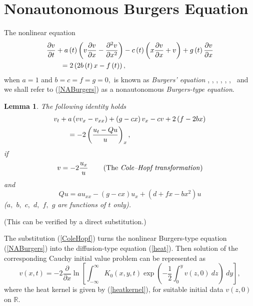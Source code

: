 \documentclass[12pt,reqno]{amsart}
\theoremstyle{plain}
\newtheorem{lemma}{Lemma}
\numberwithin{equation}{section}
\begin{document}
\section{Nonautonomous Burgers Equation}

The nonlinear equation\begin{align}
& \frac{\partial v}{\partial t}+a\left( t\right) \left( v\frac{\partial v}{\partial x}-\frac{\partial ^{2}v}{\partial x^{2}}\right) -c\left( t\right)
\left( x\frac{\partial v}{\partial x}+v\right) +g\left( t\right) \frac{\partial v}{\partial x}  \label{NABurgers} \\
& \qquad =2\left( 2b\left( t\right) x-f\left( t\right) \right) ,  \notag
\end{align}when $a=1$ and $b=c=f=g=0,$ is known as \textit{Burgers' equation} \cite{Bateman15}, \cite{Burgers48}, \cite{Cole50}, \cite{Hopf50}, \cite{Kadom:Karp71}, \cite{Sach87}, \cite{Whitham}\textit{\ }and we shall refer
to (\ref{NABurgers}) as a nonautonomous \textit{Burgers-type equation}.

\begin{lemma}
The following identity holds\begin{align}
& v_{t}+a\left( vv_{x}-v_{xx}\right) +\left( g-cx\right) v_{x}-cv+2\left(
f-2bx\right)  \notag \\
& \qquad =-2\left( \frac{u_{t}-Qu}{u}\right) _{x},  \label{BurgersIdentity}
\end{align}if\begin{equation}
v=-2\frac{u_{x}}{u}\qquad \left( \text{The \textit{Cole--Hopf transformation}}\right)  \label{ColeHopf}
\end{equation}and\begin{equation}
Qu=au_{xx}-\left( g-cx\right) u_{x}+\left( d+fx-bx^{2}\right) u
\label{HOperator}
\end{equation}($a,$ $b,$ $c,$ $d,$ $f,$ $g$ are functions of $t$ only).
\end{lemma}

(This can be verified by a direct substitution.)

The substitution (\ref{ColeHopf}) turns the nonlinear Burgers-type equation (\ref{NABurgers}) into the diffusion-type equation (\ref{heat}). Then
solution of the corresponding Cauchy initial value problem can be
represented as\begin{equation}
v\left( x,t\right) =-2\frac{\partial }{\partial x}\ln \left[ \int_{-\infty
}^{\infty }K_{0}\left( x,y,t\right) \exp \left( -\frac{1}{2}\int_{0}^{y}v\left( z,0\right) \ dz\right) \ dy\right] ,  \label{CIVPBurgers}
\end{equation}where the heat kernel is given by (\ref{heatkernel}), for suitable initial
data $v\left( z,0\right) $ on $\mathbb{R}
.$
\end{document}
